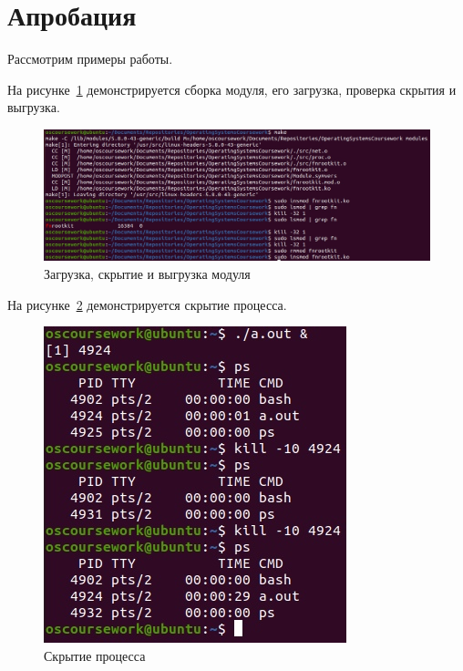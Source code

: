 \section{Апробация}%
\label{sec:aprobatsiia}

Рассмотрим примеры работы.

На рисунке~\ref{img:module_hide} демонстрируется сборка модуля, его загрузка, проверка скрытия и выгрузка.
\begin{figure}[H]
    \centering
    \includegraphics[scale=0.4]{images/scr_01.jpg}
    \caption{Загрузка, скрытие и выгрузка модуля}\label{img:module_hide}
\end{figure}

На рисунке~\ref{img:proc_hide} демонстрируется скрытие процесса.
\begin{figure}[H]
    \centering
    \includegraphics[scale=0.65]{images/scr_02.jpg}
    \caption{Скрытие процесса}\label{img:proc_hide}
\end{figure}


